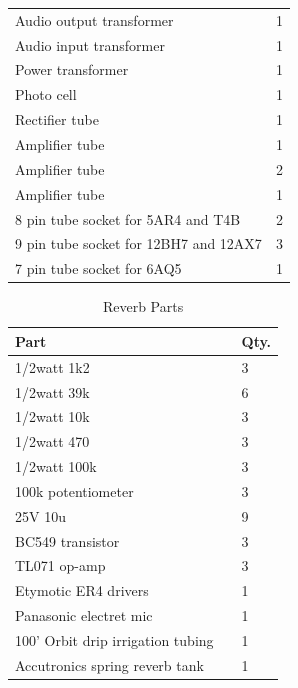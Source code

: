 \documentclass[journal]{IEEEtran}
\begin{document}
\begin{table}[]
\begin{tabular}{l|l}
			Audio output transformer              & 1          \\
			Audio input transformer               & 1          \\
			Power transformer                     & 1          \\
			Photo cell                            & 1          \\
			Rectifier tube                        & 1          \\
			Amplifier tube                        & 1          \\
			Amplifier tube                        & 2          \\
			Amplifier tube                        & 1          \\
			8 pin tube socket for 5AR4 and T4B    & 2          \\
			9 pin tube socket for 12BH7 and 12AX7 & 3          \\
			7 pin tube socket for 6AQ5            & 1         
		\end{tabular}
	\end{table}
	
	\begin{table}[]
		\centering
		\caption{Reverb Parts}
		\label{tab:reverbParts}
		\begin{tabular}{ll|l}
			Part                             &  & Qty. \\ \hline
			
			1/2watt 1k2                               &  & 3          \\
			1/2watt 39k                               &  & 6          \\
			1/2watt 10k                               &  & 3          \\
			1/2watt 470                               &  & 3          \\
			1/2watt 100k                              &  & 3          \\
			100k potentiometer                &  & 3          \\
			25V 10u                               &  & 9          \\
			BC549 transistor                  &  & 3          \\
			TL071 op-amp                      &  & 3          \\
			Etymotic ER4 drivers              &  & 1          \\
			Panasonic electret mic            &  & 1          \\
			100' Orbit drip irrigation tubing &  & 1          \\
			Accutronics spring reverb tank    &  & 1         
		\end{tabular}
	\end{table}
\end{document}

